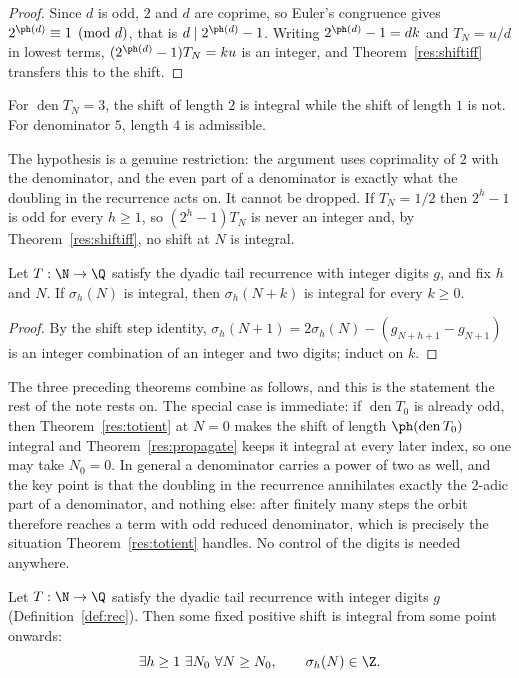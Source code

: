 \documentclass[11pt]{article}
\begin{document}
\begin{proof}
Since $d$ is odd, $2$ and $d$ are coprime, so Euler's congruence gives
$2^{\ph(d)}\equiv1\pmod d$, that is $d\mid 2^{\ph(d)}-1$.  Writing
$2^{\ph(d)}-1=dk$ and $T_N=u/d$ in lowest terms, $(2^{\ph(d)}-1)T_N=ku$ is an
integer, and Theorem~\ref{res:shiftiff} transfers this to the shift.
\end{proof}

For $\operatorname{den}T_N=3$, the shift of length $2$ is integral
while the shift of length $1$ is not.  For denominator $5$, length $4$
is admissible.

The hypothesis is a genuine restriction: the argument uses
coprimality of $2$ with the denominator, and the even part of a denominator is
exactly what the doubling in the recurrence acts on.  It cannot be dropped.
If $T_N=1/2$ then $2^{h}-1$ is odd for every $h\ge1$, so $(2^{h}-1)T_N$ is
never an integer and, by Theorem~\ref{res:shiftiff}, no shift at $N$ is
integral.

\begin{theorem}[propagation]\label{res:propagate}
Let $T:\N\to\Q$ satisfy the dyadic tail recurrence with integer digits $g$, and
fix $h$ and $N$.  If $\sigma_h(N)$ is integral, then $\sigma_h(N+k)$ is
integral for every $k\ge0$.
\end{theorem}

\begin{proof}
By the shift step identity, $\sigma_h(N+1)=2\sigma_h(N)-(g_{N+h+1}-g_{N+1})$ is
an integer combination of an integer and two digits; induct on $k$.
\end{proof}

The three preceding theorems combine as follows, and this is the statement the
rest of the note rests on.  The special case is immediate: if
$\operatorname{den}T_0$ is already odd, then Theorem~\ref{res:totient} at
$N=0$ makes the shift of length $\ph(\operatorname{den}T_0)$ integral and
Theorem~\ref{res:propagate} keeps it integral at every later index, so one may
take $N_0=0$.  In general a denominator carries a power of two as well, and the
key point is that the doubling in the recurrence annihilates
exactly the $2$-adic part of a denominator, and nothing else: after finitely
many steps the orbit therefore reaches a term with odd reduced denominator,
which is precisely the situation Theorem~\ref{res:totient} handles.  No
control of the digits is needed anywhere.

\begin{theorem}\label{res:collapse}
Let $T:\N\to\Q$ satisfy the dyadic tail recurrence with integer digits $g$
(Definition~\ref{def:rec}).  Then some fixed positive shift is integral from
some point onwards:
\[
 \exists h\ge1\ \exists N_0\ \forall N\ge N_0,\qquad
 \sigma_h(N)\in\Z .
\]
\end{theorem}
\end{document}
